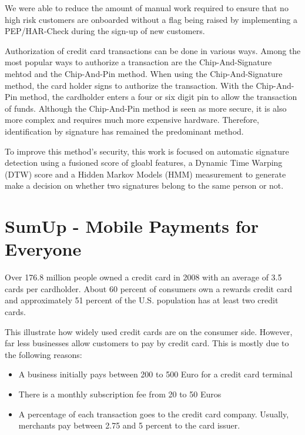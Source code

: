 \documentclass[a4paper, oneside]{csthesis}
\begin{document}
We were able to reduce the amount of manual work required to ensure that no high risk customers are onboarded without a flag being raised by implementing a PEP/HAR-Check during the sign-up of new customers.

Authorization of credit card transactions can be done in various ways. Among the most popular ways to authorize a transaction are the Chip-And-Signature mehtod and the Chip-And-Pin method. When using the Chip-And-Signature method, the card holder signs to authorize the transaction. With the Chip-And-Pin method, the cardholder enters a four or six digit pin to allow the transaction of funds. Although the Chip-And-Pin method is seen as more secure, it is also more complex and requires much more expensive hardware. Therefore, identification by signature has remained the predominant method.

To improve this method's security, this work is focused on automatic signature detection using a fusioned score of gloabl features, a Dynamic Time Warping (DTW) score and a Hidden Markov Models (HMM) measurement to generate make a decision on whether two signatures belong to the same person or not.





\section{SumUp - Mobile Payments for Everyone}
\label{intro-sumup}

Over 176.8 million people owned a credit card in 2008 with an average of 3.5 cards per cardholder. About 60 percent of consumers own a rewards credit card and approximately 51 percent of the U.S. population has at least two credit cards.\cite{woolsey2010credit}

This illustrate how widely used credit cards are on the consumer side. However, far less businesses allow customers to pay by credit card. This is mostly due to the following reasons:
\begin{itemize}
\item A business initially pays between 200 to 500 Euro for a credit card terminal
\item There is a monthly subscription fee from 20 to 50 Euros
\item A percentage of each transaction goes to the credit card company. Usually, merchants pay between 2.75 and 5 percent to the card issuer.
\end{itemize}
\end{document}
